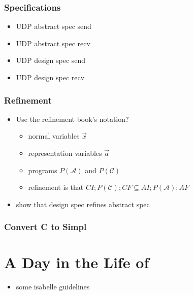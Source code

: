 \documentclass[twoside]{memoir}
\begin{document}
\subsection{Specifications}
\begin{itemize}
    \item UDP abstract spec send
    \item UDP abstract spec recv
    \item UDP design spec send
    \item UDP design spec recv
\end{itemize}

\subsection{Refinement}
\begin{itemize}
    \item Use the refinement book's notation?
        \begin{itemize}
            \item normal variables $\vec{x}$ 
            \item representation variables $\vec{a}$ 
            \item programs $P(\mathcal{A})$ and $P(\mathcal{C})$
            \item refinement is that
                 $CI; P(\mathcal{C}); CF \subseteq AI; P(\mathcal{A}); AF$
                 
        \end{itemize}
    \item show that design spec refines abstract spec
\end{itemize}

\subsection{Convert C to Simpl}

\chapter{A Day in the Life of}
\begin{itemize}
    \item some isabelle guidelines
\end{itemize}
\end{document}

